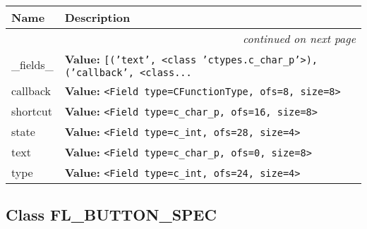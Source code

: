     \vspace{-1cm}
\hspace{\varindent}\begin{longtable}{|p{\varnamewidth}|p{\vardescrwidth}|l}
\cline{1-2}
\cline{1-2} \centering \textbf{Name} & \centering \textbf{Description}& \\
\cline{1-2}
\endhead\cline{1-2}\multicolumn{3}{r}{\small\textit{continued on next page}}\\\endfoot\cline{1-2}
\endlastfoot\raggedright \_\-f\-i\-e\-l\-d\-s\-\_\- & \raggedright \textbf{Value:} 
{\tt \texttt{[}\texttt{(}\texttt{'}\texttt{text}\texttt{'}\texttt{, }{\textless}class 'ctypes.c\_char\_p'{\textgreater}\texttt{)}\texttt{, }\texttt{(}\texttt{'}\texttt{callback}\texttt{'}\texttt{, }{\textless}class\texttt{...}}&\\
\cline{1-2}
\raggedright c\-a\-l\-l\-b\-a\-c\-k\- & \raggedright \textbf{Value:} 
{\tt {\textless}Field type=CFunctionType, ofs=8, size=8{\textgreater}}&\\
\cline{1-2}
\raggedright s\-h\-o\-r\-t\-c\-u\-t\- & \raggedright \textbf{Value:} 
{\tt {\textless}Field type=c\_char\_p, ofs=16, size=8{\textgreater}}&\\
\cline{1-2}
\raggedright s\-t\-a\-t\-e\- & \raggedright \textbf{Value:} 
{\tt {\textless}Field type=c\_int, ofs=28, size=4{\textgreater}}&\\
\cline{1-2}
\raggedright t\-e\-x\-t\- & \raggedright \textbf{Value:} 
{\tt {\textless}Field type=c\_char\_p, ofs=0, size=8{\textgreater}}&\\
\cline{1-2}
\raggedright t\-y\-p\-e\- & \raggedright \textbf{Value:} 
{\tt {\textless}Field type=c\_int, ofs=24, size=4{\textgreater}}&\\
\cline{1-2}
\end{longtable}



\subsection{Class FL\_BUTTON\_SPEC}

